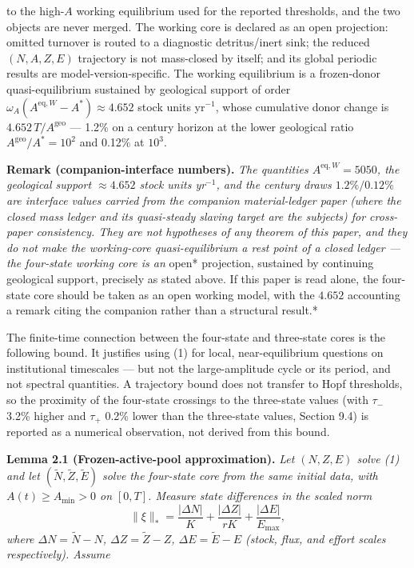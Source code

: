 \documentclass[11pt]{article}
\begin{document}
to the high-\(A\) working equilibrium used for the reported thresholds,
and the two objects are never merged. The working core is declared as an
open projection: omitted turnover is routed to a diagnostic
detritus/inert sink; the reduced \((N,A,Z,E)\) trajectory is not
mass-closed by itself; and its global periodic results are
model-version-specific. The working equilibrium is a frozen-donor
quasi-equilibrium sustained by geological support of order
\(\omega_A(A^{\mathrm{eq},W} - A^*) \approx 4.652\) stock units
yr\(^{-1}\), whose cumulative donor change is
\(4.652\,T/A^{\mathrm{geo}}\) --- 1.2\% on a century horizon at the
lower geological ratio \(A^{\mathrm{geo}}/A^* = 10^2\) and 0.12\% at
\(10^3\).

\textbf{Remark (companion-interface numbers).} \emph{The quantities
\(A^{\mathrm{eq},W} = 5050\), the geological support \(\approx 4.652\)
stock units yr\(^{-1}\), and the century draws \(1.2\%/0.12\%\) are
interface values carried from the companion material-ledger paper (where
the closed mass ledger and its quasi-steady slaving target are the
subjects) for cross-paper consistency. They are not hypotheses of any
theorem of this paper, and they do not make the working-core
quasi-equilibrium a rest point of a closed ledger --- the four-state
working core is an }open* projection, sustained by continuing geological
support, precisely as stated above. If this paper is read alone, the
four-state core should be taken as an open working model, with the
\(4.652\) accounting a remark citing the companion rather than a
structural result.*

The finite-time connection between the four-state and three-state cores
is the following bound. It justifies using (1) for local,
near-equilibrium questions on institutional timescales --- but not the
large-amplitude cycle or its period, and not spectral quantities. A
trajectory bound does not transfer to Hopf thresholds, so the proximity
of the four-state crossings to the three-state values (with \(\tau_-\)
3.2\% higher and \(\tau_+\) 0.2\% lower than the three-state values,
Section 9.4) is reported as a numerical observation, not derived from
this bound.

\textbf{Lemma 2.1 (Frozen-active-pool approximation).} \emph{Let
\((N, Z, E)\) solve (1) and let \((\tilde N, \tilde Z, \tilde E)\) solve
the four-state core from the same initial data, with
\(A(t) \ge A_{\min} > 0\) on \([0,T]\). Measure state differences in the
scaled norm}
\[\|\xi\|_* = \frac{|\Delta N|}{K} + \frac{|\Delta Z|}{rK} + \frac{|\Delta E|}{E_{\max}},\]
\emph{where \(\Delta N = \tilde N - N\), \(\Delta Z = \tilde Z - Z\),
\(\Delta E = \tilde E - E\) (stock, flux, and effort scales
respectively). Assume}
\end{document}
